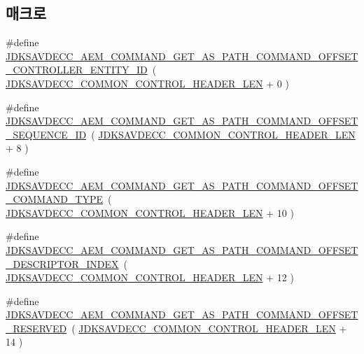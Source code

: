 \subsection*{매크로}
\begin{DoxyCompactItemize}
\item 
\#define \hyperlink{group__command__get__as__path_ga535dac1cb8f1d06f5b21b0debe71a8a3}{J\+D\+K\+S\+A\+V\+D\+E\+C\+C\+\_\+\+A\+E\+M\+\_\+\+C\+O\+M\+M\+A\+N\+D\+\_\+\+G\+E\+T\+\_\+\+A\+S\+\_\+\+P\+A\+T\+H\+\_\+\+C\+O\+M\+M\+A\+N\+D\+\_\+\+O\+F\+F\+S\+E\+T\+\_\+\+C\+O\+N\+T\+R\+O\+L\+L\+E\+R\+\_\+\+E\+N\+T\+I\+T\+Y\+\_\+\+ID}~( \hyperlink{group__jdksavdecc__avtp__common__control__header_gaae84052886fb1bb42f3bc5f85b741dff}{J\+D\+K\+S\+A\+V\+D\+E\+C\+C\+\_\+\+C\+O\+M\+M\+O\+N\+\_\+\+C\+O\+N\+T\+R\+O\+L\+\_\+\+H\+E\+A\+D\+E\+R\+\_\+\+L\+EN} + 0 )
\item 
\#define \hyperlink{group__command__get__as__path_ga8b3879c76aa47d316e82d4332e648c5e}{J\+D\+K\+S\+A\+V\+D\+E\+C\+C\+\_\+\+A\+E\+M\+\_\+\+C\+O\+M\+M\+A\+N\+D\+\_\+\+G\+E\+T\+\_\+\+A\+S\+\_\+\+P\+A\+T\+H\+\_\+\+C\+O\+M\+M\+A\+N\+D\+\_\+\+O\+F\+F\+S\+E\+T\+\_\+\+S\+E\+Q\+U\+E\+N\+C\+E\+\_\+\+ID}~( \hyperlink{group__jdksavdecc__avtp__common__control__header_gaae84052886fb1bb42f3bc5f85b741dff}{J\+D\+K\+S\+A\+V\+D\+E\+C\+C\+\_\+\+C\+O\+M\+M\+O\+N\+\_\+\+C\+O\+N\+T\+R\+O\+L\+\_\+\+H\+E\+A\+D\+E\+R\+\_\+\+L\+EN} + 8 )
\item 
\#define \hyperlink{group__command__get__as__path_gaeb242f8c0234d9361c3a45be0e0f423d}{J\+D\+K\+S\+A\+V\+D\+E\+C\+C\+\_\+\+A\+E\+M\+\_\+\+C\+O\+M\+M\+A\+N\+D\+\_\+\+G\+E\+T\+\_\+\+A\+S\+\_\+\+P\+A\+T\+H\+\_\+\+C\+O\+M\+M\+A\+N\+D\+\_\+\+O\+F\+F\+S\+E\+T\+\_\+\+C\+O\+M\+M\+A\+N\+D\+\_\+\+T\+Y\+PE}~( \hyperlink{group__jdksavdecc__avtp__common__control__header_gaae84052886fb1bb42f3bc5f85b741dff}{J\+D\+K\+S\+A\+V\+D\+E\+C\+C\+\_\+\+C\+O\+M\+M\+O\+N\+\_\+\+C\+O\+N\+T\+R\+O\+L\+\_\+\+H\+E\+A\+D\+E\+R\+\_\+\+L\+EN} + 10 )
\item 
\#define \hyperlink{group__command__get__as__path_gaf69661a91a166ba970518da819e32862}{J\+D\+K\+S\+A\+V\+D\+E\+C\+C\+\_\+\+A\+E\+M\+\_\+\+C\+O\+M\+M\+A\+N\+D\+\_\+\+G\+E\+T\+\_\+\+A\+S\+\_\+\+P\+A\+T\+H\+\_\+\+C\+O\+M\+M\+A\+N\+D\+\_\+\+O\+F\+F\+S\+E\+T\+\_\+\+D\+E\+S\+C\+R\+I\+P\+T\+O\+R\+\_\+\+I\+N\+D\+EX}~( \hyperlink{group__jdksavdecc__avtp__common__control__header_gaae84052886fb1bb42f3bc5f85b741dff}{J\+D\+K\+S\+A\+V\+D\+E\+C\+C\+\_\+\+C\+O\+M\+M\+O\+N\+\_\+\+C\+O\+N\+T\+R\+O\+L\+\_\+\+H\+E\+A\+D\+E\+R\+\_\+\+L\+EN} + 12 )
\item 
\#define \hyperlink{group__command__get__as__path_ga4fe9082649795646922035d2ba9165a7}{J\+D\+K\+S\+A\+V\+D\+E\+C\+C\+\_\+\+A\+E\+M\+\_\+\+C\+O\+M\+M\+A\+N\+D\+\_\+\+G\+E\+T\+\_\+\+A\+S\+\_\+\+P\+A\+T\+H\+\_\+\+C\+O\+M\+M\+A\+N\+D\+\_\+\+O\+F\+F\+S\+E\+T\+\_\+\+R\+E\+S\+E\+R\+V\+ED}~( \hyperlink{group__jdksavdecc__avtp__common__control__header_gaae84052886fb1bb42f3bc5f85b741dff}{J\+D\+K\+S\+A\+V\+D\+E\+C\+C\+\_\+\+C\+O\+M\+M\+O\+N\+\_\+\+C\+O\+N\+T\+R\+O\+L\+\_\+\+H\+E\+A\+D\+E\+R\+\_\+\+L\+EN} + 14 )

\end{DoxyCompactItemize}
